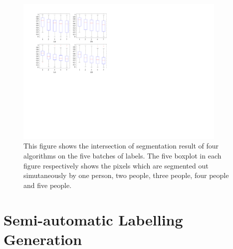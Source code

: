 \documentclass[runningheads,a4paper]{llncs}
\begin{document}
\begin{figure}[!h]
\centering
\includegraphics[width=0.9\textwidth]{fig_segment.pdf}
\caption{ This figure shows the intersection of segmentation result of four algorithms on the five batches of labels. The five boxplot in each figure respectively shows the pixels which are segmented out simutaneously by one person, two people, three people, four people and five people.}
\label{fig:seg-inter}
\end{figure}



\section{Semi-automatic Labelling Generation}
\end{document}
